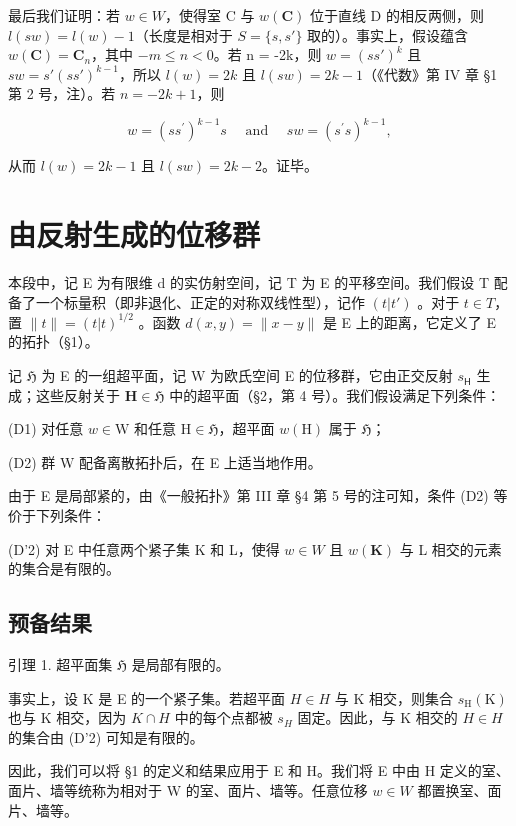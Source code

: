 最后我们证明：若 \(w \in W\)，使得室 C 与 \(w(\mathbf{C})\) 位于直线 D 的相反两侧，则 \(l(sw) = l(w) - 1\)（长度是相对于 \(S = \{s, s'\}\) 取的）。事实上，假设蕴含 \(w(\mathbf{C}) = \mathbf{C}_n\)，其中 \(-m \leqslant n < 0\)。若 n = -2k，则 \(w = (ss')^k\) 且 \(sw = s'(ss')^{k-1}\)，所以 \(l(w) = 2k\) 且 \(l(sw) = 2k - 1\)（《代数》第 IV 章 §1 第 2 号，注）。若 \(n = -2k + 1\)，则

\[
w = \left(s s ^ {\prime}\right) ^ {k - 1} s \quad \text { and } \quad s w = \left(s ^ {\prime} s\right) ^ {k - 1},
\]

从而 \(l(w) = 2k - 1\) 且 \(l(sw) = 2k - 2\)。证毕。

\section{由反射生成的位移群}

本段中，记 E 为有限维 d 的实仿射空间，记 T 为 E 的平移空间。我们假设 T 配备了一个标量积（即非退化、正定的对称双线性型），记作 \((t|t')\) 。对于 \(t \in T\)，置 \(\|t\| = (t|t)^{1/2}\) 。函数 \(d(x, y) = \|x - y\|\) 是 E 上的距离，它定义了 E 的拓扑（§1）。

记 \(\mathfrak{H}\) 为 E 的一组超平面，记 W 为欧氏空间 E 的位移群，它由正交反射 \(s_{\mathsf{H}}\) 生成；这些反射关于 \(\mathbf{H} \in \mathfrak{H}\) 中的超平面（§2，第 4 号）。我们假设满足下列条件：

(D1) 对任意 \(w \in \mathrm{W}\) 和任意 \(\mathrm{H} \in \mathfrak{H}\)，超平面 \(w(\mathrm{H})\) 属于 \(\mathfrak{H}\)；

(D2) 群 W 配备离散拓扑后，在 E 上适当地作用。

由于 E 是局部紧的，由《一般拓扑》第 III 章 §4 第 5 号的注可知，条件 (D2) 等价于下列条件：

(D'2) 对 E 中任意两个紧子集 K 和 L，使得 \(w \in W\) 且 \(w(\mathbf{K})\) 与 L 相交的元素的集合是有限的。

\subsection{预备结果}

引理 1. 超平面集 \(\mathfrak{H}\) 是局部有限的。

事实上，设 K 是 E 的一个紧子集。若超平面 \(H \in H\) 与 K 相交，则集合 \(s_{\mathrm{H}}(\mathrm{K})\) 也与 K 相交，因为 \(K \cap H\) 中的每个点都被 \(s_{H}\) 固定。因此，与 K 相交的 \(H \in H\) 的集合由 (D'2) 可知是有限的。

因此，我们可以将 §1 的定义和结果应用于 E 和 H。我们将 E 中由 H 定义的室、面片、墙等统称为相对于 W 的室、面片、墙等。任意位移 \(w \in W\) 都置换室、面片、墙等。

